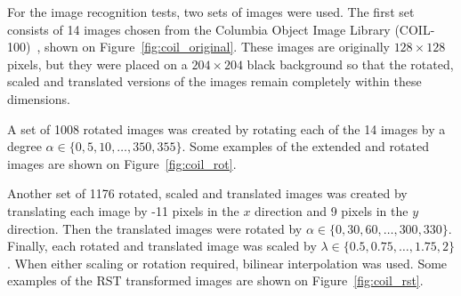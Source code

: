 For the image recognition tests, two sets of images were used. The first set consists of 14 images chosen from the Columbia Object Image Library (COIL-100)~\cite{coil}, shown on Figure~\ref{fig:coil_original}. These images are originally $128 \times 128$ pixels, but they were placed on a $204 \times 204$ black background so that the rotated, scaled and translated versions of the images remain completely within these dimensions. 

A set of 1008 rotated images was created by rotating each of the 14 images by a degree $\alpha\in\{0,5,10,\ldots,350,355\}$. Some examples of the extended and rotated images are shown on Figure~\ref{fig:coil_rot}.

Another set of 1176 rotated, scaled and translated images was created by translating each image by -11 pixels in the $x$ direction and 9 pixels in the $y$ direction. Then the translated images were rotated by $\alpha \in \{0,30,60,\ldots,300,330\}$. Finally, each rotated and translated image was scaled by $\lambda \in \{0.5, 0.75, \ldots, 1.75, 2\}$. When either scaling or rotation required, bilinear interpolation was used.
Some examples of the RST transformed images are shown on Figure~\ref{fig:coil_rst}.

